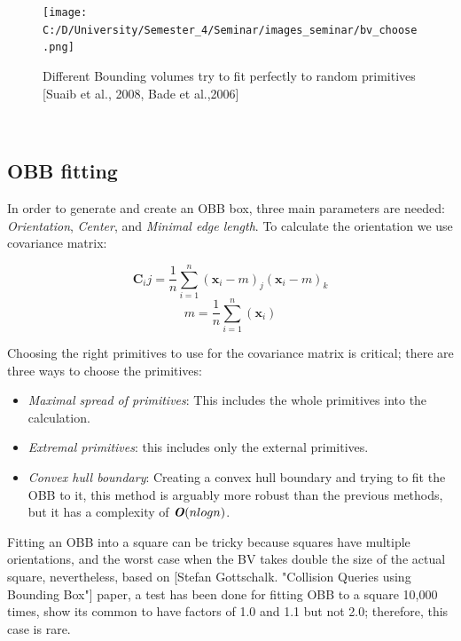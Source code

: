 \documentclass[11pt,a4paper]{article}
\begin{document}
	\begin{figure}[h]
		\begin{center}
			\texttt{[image: C:/D/University/Semester\_4/Seminar/images\_seminar/bv\_choose.png]}
			
			\caption{Different Bounding volumes try to fit perfectly to random primitives [Suaib et al., 2008, Bade et al.,2006]}
			\label{fig:2}
		\end{center}
	\end{figure}
	\begin{verbatim}
		
	\end{verbatim}
	
	
	\subsection{OBB fitting}
	In order to generate and create an OBB box, three main parameters are needed: \textit{Orientation}, \textit{Center}, and \textit{Minimal edge length}.
	To calculate the orientation we use covariance matrix:
	
	\begin{equation}
		\textbf{C}_ij = \frac{1}{n}\sum_{i=1}^{n} (\textbf{x}_i - m)_j(\textbf{x}_i - m)_k 
	\end{equation}
	\begin{equation}
		m = \frac{1}{n}\sum_{i=1}^{n} (\textbf{x}_i)
	\end{equation}
	
	
	
	
	Choosing the right primitives to use for the covariance matrix is critical; there are three ways to choose the primitives: 	
	
	\begin{itemize}
		\item \textit{Maximal spread of primitives}: This includes the whole primitives into the calculation.
		\item \textit{Extremal primitives}: this includes only the external primitives. 
		\item \textit{Convex hull boundary}: Creating a convex hull boundary and trying to fit the OBB to it, this method is arguably more robust than the previous methods, but it has a complexity of $\textbf{\textit{O}}(nlogn)$.
	\end{itemize} 
	
	Fitting an OBB into a square can be tricky because squares have multiple orientations, and the worst case when the BV takes double the size of the actual square, nevertheless, based on [Stefan Gottschalk. "Collision Queries using Bounding Box"] paper, a test has been done for fitting OBB to a square 10,000 times, show its common to have factors of 1.0 and 1.1  but not 2.0; therefore, this case is rare. 
	
\end{document}
